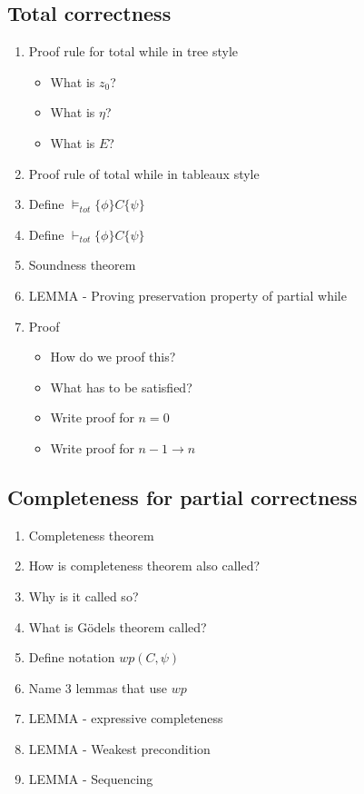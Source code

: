 \documentclass[fleqn]{article}
\begin{document}
\subsection{Total correctness}
\begin{enumerate}
    \item Proof rule for total while in tree style
    \begin{itemize}
        \item What is $z_0$?
        \item What is $\eta$?
        \item What is $E$?
    \end{itemize}
    \item Proof rule of total while in tableaux style
    \item Define $\models_{tot} \{ \phi \} C \{ \psi \}$
    \item Define $\vdash_{tot} \{ \phi \} C \{ \psi \}$
    \item Soundness theorem
    \item LEMMA - Proving preservation property of partial while
    \item Proof
    \begin{itemize}
        \item How do we proof this?
        \item What has to be satisfied?
        \item Write proof for $n=0$
        \item Write proof for $n - 1 \rightarrow n$
    \end{itemize}
\end{enumerate}

\subsection{Completeness for partial correctness}
\begin{enumerate}
    \item Completeness theorem
    \item How is completeness theorem also called?
    \item Why is it called so?
    \item What is Gödels theorem called?
    \item Define notation $wp(C, \psi)$
    \item Name 3 lemmas that use $wp$
    \item LEMMA - expressive completeness
    \item LEMMA - Weakest precondition
    \item LEMMA - Sequencing
\end{enumerate}
\end{document}
